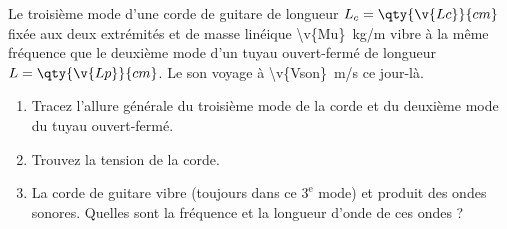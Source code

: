 
Le troisième mode d'une corde de guitare de longueur $L_c = \qty{\v{Lc}}{cm}$ fixée aux deux extrémités et de masse linéique \qty{\v{Mu}}{kg/m} vibre à la même fréquence que le deuxième mode d'un tuyau ouvert-fermé de longueur $L = \qty{\v{Lp}}{cm}$. Le son voyage à \qty{\v{Vson}}{m/s} ce jour-là.

\begin{enumerate}[label=\alph*)]
    \item Tracez l'allure générale du troisième mode de la corde et du deuxième mode du tuyau ouvert-fermé.
    \item Trouvez la tension de la corde.
    \item La corde de guitare vibre (toujours dans ce $3^\text{e}$ mode) et produit des ondes sonores. Quelles sont la fréquence et la longueur d'onde de ces ondes ?
\end{enumerate}